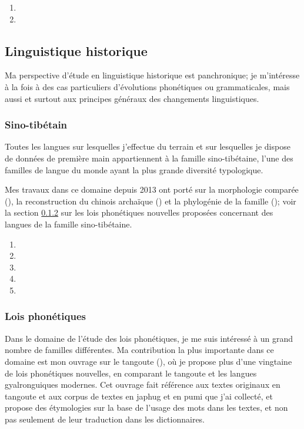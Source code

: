 \documentclass[oldfontcommands,oneside,a4paper,11pt]{article}
\begin{document}
\begin{enumerate}
 \item  {}
  \item  {}
\end{enumerate}

\subsection{Linguistique historique} \label{sec:linghist}
Ma perspective d'étude en linguistique historique est panchronique; je m'intéresse à la fois à des cas particuliers d'évolutions phonétiques ou grammaticales, mais aussi et surtout aux principes généraux des changements linguistiques. 


\subsubsection{Sino-tibétain}
Toutes les langues sur lesquelles j'effectue du terrain et sur lesquelles je dispose de données de première main appartiennent à la famille sino-tibétaine,  l'une des familles de langue du monde ayant la plus grande diversité typologique.

Mes travaux dans ce domaine depuis 2013 ont porté sur la morphologie comparée (\citealt{jacques15causative, jacques16th}), la reconstruction du chinois archaïque (\citealt{jacques16ssuffixes, jacques17buyang}) et la phylogénie de la famille (\citealt{jacques17genetic}); voir la section \ref{sec:lois.phonetiques} sur les lois phonétiques nouvelles proposées  concernant des langues de la famille sino-tibétaine.
 
\begin{enumerate}
 \item {}
 \item {}
 \item {}
 \item {}
  \item {}
\end{enumerate}
 
\subsubsection{Lois phonétiques} \label{sec:lois.phonetiques}
Dans le domaine de l'étude des lois phonétiques, je me suis intéressé à un grand nombre de familles différentes. Ma contribution la plus importante dans ce domaine est mon ouvrage sur le tangoute (\citealt{jacques14esquisse}), où je propose plus d'une vingtaine de lois phonétiques nouvelles, en comparant le tangoute et les langues gyalronguiques modernes. Cet ouvrage fait référence aux textes originaux en tangoute et aux corpus de textes en japhug et en pumi que j'ai collecté, et propose des étymologies sur la base de l'usage des mots dans les textes, et non pas seulement de leur traduction dans les dictionnaires.  
\end{document}
